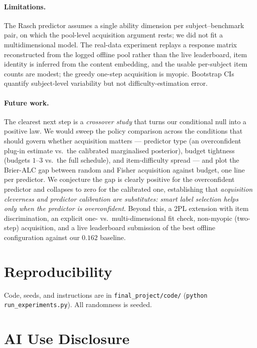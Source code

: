 \documentclass{article}
\begin{document}
\paragraph{Limitations.} The Rasch predictor assumes a single ability dimension
per subject--benchmark pair, on which the pool-level acquisition argument rests;
we did not fit a multidimensional model. The real-data experiment replays a
response matrix reconstructed from the logged offline pool rather than the live
leaderboard, item identity is inferred from the content embedding, and the usable
per-subject item counts are modest; the greedy one-step acquisition is myopic.
Bootstrap CIs quantify subject-level variability but not difficulty-estimation
error.

\paragraph{Future work.} The clearest next step is a \emph{crossover study} that
turns our conditional null into a positive law. We would sweep the policy
comparison across the conditions that should govern whether acquisition matters
--- predictor type (an overconfident plug-in estimate vs.\ the calibrated
marginalised posterior), budget tightness (budgets $1$--$3$ vs.\ the full
schedule), and item-difficulty spread --- and plot the Brier-ALC gap between
random and Fisher acquisition against budget, one line per predictor. We
conjecture the gap is clearly positive for the overconfident predictor and
collapses to zero for the calibrated one, establishing that \emph{acquisition
cleverness and predictor calibration are substitutes: smart label selection helps
only when the predictor is overconfident}. Beyond this, a 2PL extension with item
discrimination, an explicit one- vs.\ multi-dimensional fit check, non-myopic
(two-step) acquisition, and a live leaderboard submission of the best offline
configuration against our $0.162$ baseline.

\section*{Reproducibility}
Code, seeds, and instructions are in \texttt{final\_project/code/}
(\texttt{python run\_experiments.py}). All randomness is seeded.

\section*{AI Use Disclosure}
\end{document}
